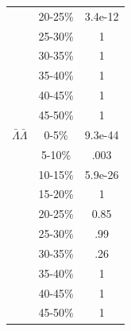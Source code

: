 \begin{table}
\begin{minipage}{18pc}
\begin{center}
\begin{tabular}{| c | c | c |}
   & 20-25\% & 3.4e-12 \\
   & 25-30\% & 1 \\
   & 30-35\% & 1 \\
   & 35-40\% & 1 \\
   & 40-45\% & 1 \\
   & 45-50\% & 1 \\
   \hline
  $\bar{\Lambda}\bar{\Lambda}$ &  0-5\% & 9.3e-44 \\
   & 5-10\% & .003 \\
   & 10-15\% & 5.9e-26 \\
   & 15-20\% & 1 \\
   & 20-25\% & 0.85 \\
   & 25-30\% & .99 \\
   & 30-35\% & .26 \\
   & 35-40\% & 1 \\
   & 40-45\% & 1 \\
   & 45-50\% & 1 \\
   \hline
\end{tabular}
\end{center}
\end{minipage}
\end{table}

